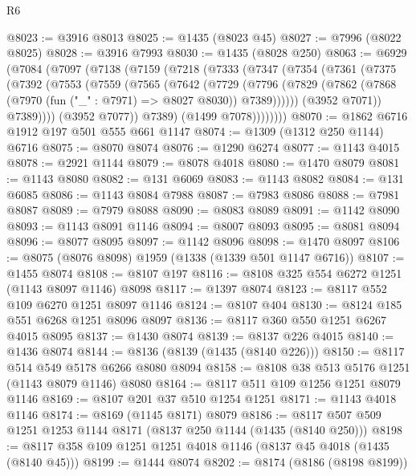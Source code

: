 \begin{lexlean}{R6}
\begin{coremodule}
@8023 := @3916 @8013
@8025 := @1435 (@8023 @45)
@8027 := @7996 (@8022 @8025)
@8028 := @3916 @7993
@8030 := @1435 (@8028 @250)
@8063 := @6929
    (@7084
      (@7097
        (@7138
          (@7159
            (@7218
              (@7333
                (@7347
                  (@7354
                    (@7361
                      (@7375
                        (@7392
                          (@7553
                            (@7559
                              (@7565
                                (@7642
                                  (@7729
                                    (@7796
                                      (@7829
                                        (@7862
                                          (@7868
                                            (@7970 (fun ("_" : @7971) => @8027 @8030))
                                            @7389))))))
                                (@3952 @7071))
                              @7389))))
                      (@3952 @7077))
                    @7389)
                  (@1499 @7078))))))))
@8070 := @1862 @6716 @1912 @197 @501 @555 @661 @1147
@8074 := @1309 (@1312 @250 @1144) @6716
@8075 := @8070 @8074
@8076 := @1290 @6274
@8077 := @1143 @4015
@8078 := @2921 @1144
@8079 := @8078 @4018
@8080 := @1470 @8079
@8081 := @1143 @8080
@8082 := @131 @6069
@8083 := @1143 @8082
@8084 := @131 @6085
@8086 := @1143 @8084 @7988
@8087 := @7983 @8086
@8088 := @7981 @8087
@8089 := @7979 @8088
@8090 := @8083 @8089
@8091 := @1142 @8090
@8093 := @1143 @8091 @1146
@8094 := @8007 @8093
@8095 := @8081 @8094
@8096 := @8077 @8095
@8097 := @1142 @8096
@8098 := @1470 @8097
@8106 := @8075 (@8076 @8098) @1959 (@1338 (@1339 @501 @1147 @6716))
@8107 := @1455 @8074
@8108 := @8107 @197
@8116 := @8108 @325 @554 @6272 @1251 (@1143 @8097 @1146) @8098
@8117 := @1397 @8074
@8123 := @8117 @552 @109 @6270 @1251 @8097 @1146
@8124 := @8107 @404
@8130 := @8124 @185 @551 @6268 @1251 @8096 @8097
@8136 := @8117 @360 @550 @1251 @6267 @4015 @8095
@8137 := @1430 @8074
@8139 := @8137 @226 @4015
@8140 := @1436 @8074
@8144 := @8136 (@8139 (@1435 (@8140 @226)))
@8150 := @8117 @514 @549 @5178 @6266 @8080 @8094
@8158 := @8108 @38 @513 @5176 @1251 (@1143 @8079 @1146) @8080
@8164 := @8117 @511 @109 @1256 @1251 @8079 @1146
@8169 := @8107 @201 @37 @510 @1254 @1251
@8171 := @1143 @4018 @1146
@8174 := @8169 (@1145 @8171) @8079
@8186 := @8117 @507 @509 @1251 @1253 @1144 @8171 (@8137 @250 @1144 (@1435 (@8140 @250)))
@8198 := @8117 @358 @109 @1251 @1251 @4018 @1146 (@8137 @45 @4018 (@1435 (@8140 @45)))
@8199 := @1444 @8074
@8202 := @8174 (@8186 (@8198 @8199))

\end{coremodule}
\end{lexlean}
